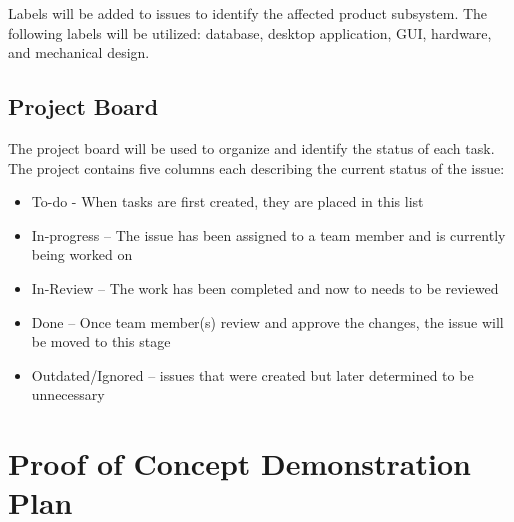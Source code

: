 \documentclass[12pt]{article}
\begin{document}
\noindent
Labels will be added to issues to identify the affected product subsystem. The following labels will be utilized: 
database, desktop application, GUI, hardware, and mechanical design.

\subsection{Project Board}
The project board will be used to organize and identify the status of each task. 
The project contains five columns each describing the current status of the issue:

\begin{itemize}
	\item To-do - When tasks are first created, they are placed in this list
	\item In-progress – The issue has been assigned to a team member and is currently being worked on
	\item In-Review – The work has been completed and now to needs to be reviewed
	\item Done – Once team member(s) review and approve the changes, the issue will be moved to this stage
	\item Outdated/Ignored – issues that were created but later determined to be unnecessary 
\end{itemize}

\section{Proof of Concept Demonstration Plan}
\end{document}
